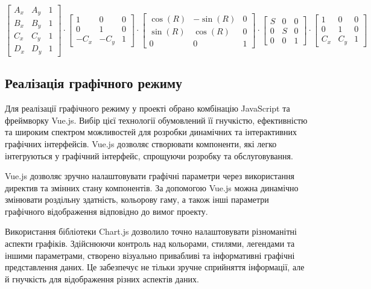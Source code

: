 \documentclass[oneside,14pt]{extarticle}
\begin{document}
\begin{normalsize}
	\[
	\begin{bmatrix} 
		A_x & A_y & 1 \\
		B_x & B_y & 1 \\
		C_x & C_y & 1 \\
		D_x & D_y & 1
	\end{bmatrix}
	\cdot
	\begin{bmatrix} 
		1 & 0 & 0 \\
		0 & 1 & 0 \\
		-C_x & -C_y & 1
	\end{bmatrix} 
	\cdot
	\begin{bmatrix} 
		 \cos(R) & -\sin(R) & 0 \\
		\sin(R) & \cos(R) & 0 \\
		0 & 0 & 1
	\end{bmatrix} 
	\cdot
	\begin{bmatrix} 
		S & 0 & 0 \\
		0 & S & 0 \\
		0 & 0 & 1
	\end{bmatrix}
	\cdot
	\begin{bmatrix} 
		1 & 0 & 0 \\
		0 & 1 & 0 \\
		C_x & C_y & 1
	\end{bmatrix} \]
	\subsection{Реалізація графічного режиму}
	Для реалізації графічного режиму у проекті обрано комбінацію JavaScript та фреймворку Vue.js. Вибір цієї технології обумовлений її гнучкістю, ефективністю та широким спектром можливостей для розробки динамічних та інтерактивних графічних інтерфейсів. Vue.js дозволяє створювати компоненти, які легко інтегруються у графічний інтерфейс, спрощуючи розробку та обслуговування.
	
	Vue.js дозволяє зручно налаштовувати графічні параметри через використання директив та змінних стану компонентів. За допомогою Vue.js можна динамічно змінювати роздільну здатність, кольорову гаму, а також інші параметри графічного відображення відповідно до вимог проекту.
	
	Використання бібліотеки Chart.js дозволило точно налаштовувати різноманітні аспекти графіків. Здійснюючи контроль над кольорами, стилями, легендами та іншими параметрами, створено візуально привабливі та інформативні графічні представлення даних. Це забезпечує не тільки зручне сприйняття інформації, але й гнучкість для відображення різних аспектів даних.
	

\end{normalsize}
\end{document}
